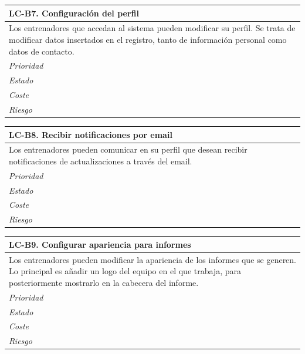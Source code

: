 	\begin{center}
		\begin{tabularx}{15cm}{|X|}
			\hline 
				\bf{LC-B7. Configuración del perfil}\\
			\hline
				Los entrenadores que accedan al sistema pueden modificar su perfil. Se trata de modificar datos insertados en el registro, tanto de información personal como datos de contacto.\\
			\hline
				\it{Prioridad}\\
			\hline
				\it{Estado}\\
			\hline
				\it{Coste}\\
			\hline
				\it{Riesgo}\\
			\hline
		\end{tabularx}
	\end{center}
	
	\begin{center}
		\begin{tabularx}{15cm}{|X|}
			\hline 
				\bf{LC-B8. Recibir notificaciones por email}\\
			\hline
				Los entrenadores pueden comunicar en su perfil que desean recibir notificaciones de actualizaciones a través del email.\\
			\hline
				\it{Prioridad}\\
			\hline
				\it{Estado}\\
			\hline
				\it{Coste}\\
			\hline
				\it{Riesgo}\\
			\hline
		\end{tabularx}
	\end{center}
	
	\begin{center}
		\begin{tabularx}{15cm}{|X|}
			\hline 
				\bf{LC-B9. Configurar apariencia para informes}\\
			\hline
				Los entrenadores pueden modificar la apariencia de los informes que se generen. Lo principal es añadir un logo del equipo en el que trabaja, para posteriormente mostrarlo en la cabecera del informe.\\
			\hline
				\it{Prioridad}\\
			\hline
				\it{Estado}\\
			\hline
				\it{Coste}\\
			\hline
				\it{Riesgo}\\
			\hline
		\end{tabularx}
	\end{center}
	
